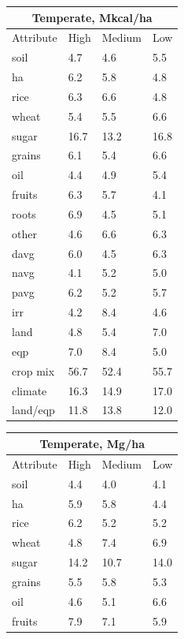 \documentclass[12pt,twoside]{article}
\begin{document}
\begin{table}
\centering
\parbox{.45\linewidth} {
\begin{tabular}{llll}
\toprule
\multicolumn{4}{c}{\textbf{Temperate, Mkcal/ha}} \\
\midrule
Attribute & High & Medium & Low \\
\midrule
soil & 4.7 & 4.6 & 5.5 \\
ha & 6.2 & 5.8 & 4.8 \\
rice & 6.3 & 6.6 & 4.8 \\
wheat & 5.4 & 5.5 & 6.6 \\
sugar & 16.7 & 13.2 & 16.8 \\
grains & 6.1 & 5.4 & 6.6 \\
oil & 4.4 & 4.9 & 5.4 \\
fruits & 6.3 & 5.7 & 4.1 \\
roots & 6.9 & 4.5 & 5.1 \\
other & 4.6 & 6.6 & 6.3 \\
davg & 6.0 & 4.5 & 6.3 \\
navg & 4.1 & 5.2 & 5.0 \\
pavg & 6.2 & 5.2 & 5.7 \\
irr & 4.2 & 8.4 & 4.6 \\
land & 4.8 & 5.4 & 7.0 \\
eqp & 7.0  & 8.4 & 5.0 \\
\midrule
crop mix & 56.7 & 52.4 & 55.7 \\
climate & 16.3 & 14.9 & 17.0 \\
land/eqp & 11.8 & 13.8 & 12.0 \\
\bottomrule
\end{tabular}
\label{k.ny.temp_percentages}
}
\parbox{.45\linewidth} {
\centering
\begin{tabular}{llll}
\toprule
\multicolumn{4}{c}{\textbf{Temperate, Mg/ha}} \\
\midrule
Attribute & High & Medium & Low \\
\midrule
soil & 4.4 & 4.0 & 4.1 \\
ha & 5.9 & 5.8 & 4.4 \\
rice & 6.2 & 5.2 & 5.2 \\
wheat & 4.8 & 7.4 & 6.9 \\
sugar & 14.2 & 10.7 & 14.0 \\
grains & 5.5 & 5.8 & 5.3 \\
oil & 4.6 & 5.1 & 6.6 \\
fruits & 7.9 & 7.1 & 5.9 \\

\end{tabular}}
\end{table}
\end{document}
